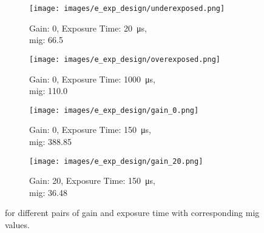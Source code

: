         \begin{figure}[h]
            \centering
            \begin{subfigure}[b]{0.4\textwidth}
                \centering
                \texttt{[image: images/e\_exp\_design/underexposed.png]}
                \caption{Gain: 0, Exposure Time: \SI{20}{\micro\second},\\\gls{mig}: 66.5}
                \label{subfig:underexposed.png}
            \end{subfigure}
            \hspace{1cm}
            \begin{subfigure}[b]{0.4\textwidth}
                \centering
                \texttt{[image: images/e\_exp\_design/overexposed.png]}
                \caption{Gain: 0, Exposure Time: \SI{1000}{\micro\second},\\\gls{mig}: 110.0}
                \label{subfig:underexposed.png}
            \end{subfigure}

            \vspace{5mm}
            
            \begin{subfigure}[b]{0.4\textwidth}
                \centering
                \texttt{[image: images/e\_exp\_design/gain\_0.png]}
                \caption{Gain: 0, Exposure Time: \SI{150}{\micro\second},\\\gls{mig}: 388.85}
                \label{subfig:underexposed.png}
            \end{subfigure}
            \hspace{1cm}
            \begin{subfigure}[b]{0.4\textwidth}
                \centering
                \texttt{[image: images/e\_exp\_design/gain\_20.png]}
                \caption{Gain: 20, Exposure Time: \SI{150}{\micro\second},\\\gls{mig}: 36.48}
                \label{subfig:underexposed.png}
            \end{subfigure}
            \caption{ for different pairs of gain and exposure time with corresponding \gls{mig} values.}
        \end{figure}

